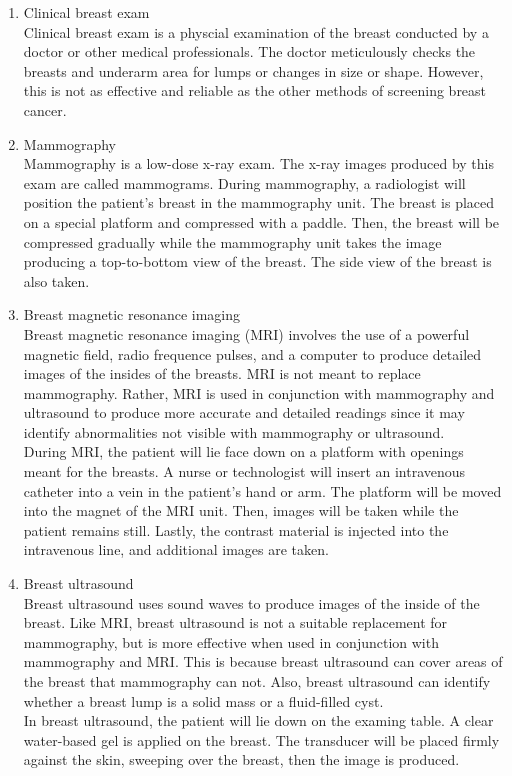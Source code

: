\begin{enumerate}
	\item Clinical breast exam \\
	Clinical breast exam is a physcial examination of the breast conducted by a doctor or other medical professionals. The doctor meticulously checks the breasts and underarm area for lumps or changes in size or shape. However, this is not as effective and reliable as the other methods of screening breast cancer.

	\item Mammography \\
	Mammography is a low-dose x-ray exam. The x-ray images produced by this exam are called mammograms. During mammography, a radiologist will position the patient's breast in the mammography unit. The breast is placed on a special platform and compressed with a paddle. Then, the breast will be compressed gradually while the mammography unit takes the image producing a top-to-bottom view of the breast. The side view of the breast is also taken.

	\item Breast magnetic resonance imaging \\
	Breast magnetic resonance imaging (MRI) involves the use of a powerful magnetic field, radio frequence pulses, and a computer to produce detailed images of the insides of the breasts. MRI is not meant to replace mammography. Rather, MRI is used in conjunction with mammography and ultrasound to produce more accurate and detailed readings since it may identify abnormalities not visible with mammography or ultrasound. \\

	During MRI, the patient will lie face down on a platform with openings meant for the breasts. A nurse or technologist will insert an intravenous catheter into a vein in the patient's hand or arm. The platform will be moved into the magnet of the MRI unit. Then, images will be taken while the patient remains still. Lastly, the contrast material is injected into the intravenous line, and additional images are taken.

	\item Breast ultrasound \\
	Breast ultrasound uses sound waves to produce images of the inside of the breast. Like MRI, breast ultrasound is not a suitable replacement for mammography, but is more effective when used in conjunction with mammography and MRI. This is because breast ultrasound can cover areas of the breast that mammography can not. Also, breast ultrasound can identify whether a breast lump is a solid mass or a fluid-filled cyst. \\
	
	In breast ultrasound, the patient will lie down on the examing table. A clear water-based gel is applied on the breast. The transducer will be placed firmly against the skin, sweeping over the breast, then the image is produced.
\end{enumerate}

